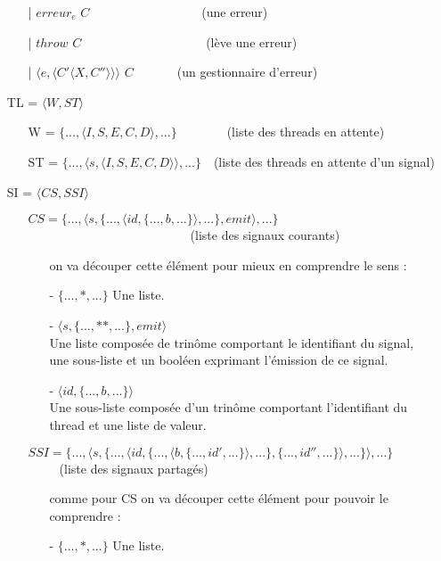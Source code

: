 \documentclass[10pt,a4paper]{article}
\begin{document}
\begin{itemize}
\begin{itemize}
					\item[|] $erreur_{e}$ $C$~~~~~~~~~~~~~~~~~~(une erreur)
					\item[|] $throw$ $C$~~~~~~~~~~~~~~~~~~~~(lève une erreur)
					\item[|] $\langle e,\langle C'\langle X,C''\rangle\rangle\rangle$ $C$~~~~~~~(un gestionnaire d'erreur)
				\end{itemize}
				\item[] TL = $\langle W,ST\rangle$
				\begin{itemize}
					\item[] W = $\{...,\langle I,S,E,C,D\rangle,...\}$~~~~~~~~(liste des threads en attente)
					\item[] ST = $\{...,\langle s,\langle I,S,E,C,D\rangle\rangle,...\}$~~(liste des threads en attente d'un signal)
				\end{itemize}
				\item[] SI = $\langle CS,SSI\rangle$
				\begin{itemize}
					\item[] $CS = \{...,\langle s,\{...,\langle id,\{...,b,...\}\rangle,...\},emit\rangle,...\}$~~~~~~~~~~~~~~~~~~~~~~~~~~(liste des signaux courants)
					\begin{itemize}
						\item [] on va découper cette élément pour mieux en comprendre le sens :
						\item[] - $\{...,*,...\}$ Une liste. 
						\item[] - $\langle s,\{...,**,...\},emit\rangle$ \\
						Une liste composée de trinôme comportant le identifiant du signal, une sous-liste et un booléen exprimant l'émission de ce signal.
						\item[] - $\langle id,\{...,b,...\}\rangle$ \\
						Une sous-liste composée d'un trinôme comportant l'identifiant du thread et une liste de valeur.
					\end{itemize}
					\item[]
					\item[] $SSI =  \{...,\langle s,\{...,\langle id,\{...,\langle b,\{...,id',...\}\rangle,...\},\{...,id'',...\}\rangle,...\}\rangle,...\}$~~~~~(liste des signaux partagés)
					\begin{itemize}
						\item[] comme pour CS on va découper cette élément pour pouvoir le comprendre :
						\item[] - $\{...,*,...\}$ Une liste. 

\end{itemize}
\end{itemize}
\end{itemize}
\end{document}
